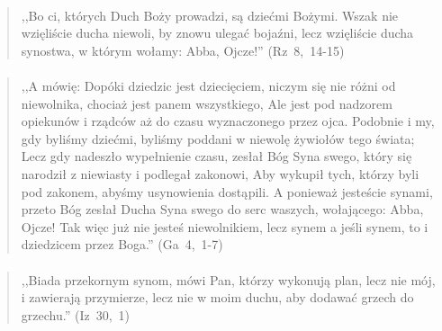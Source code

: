 \documentclass[10pt,a4paper,oneside]{article}
\begin{document}
\paragraph{}
\begin{quote}
,,Bo ci, których Duch Boży prowadzi, są dziećmi Bożymi. Wszak nie wzięliście ducha niewoli, by znowu ulegać bojaźni, lecz wzięliście ducha synostwa, w którym wołamy: Abba, Ojcze!'' \mbox{(Rz 8, 14-15)}
\end{quote}
\paragraph{}
\begin{quote}
,,A mówię: Dopóki dziedzic jest dziecięciem, niczym się nie różni od niewolnika, chociaż jest panem wszystkiego, Ale jest pod nadzorem opiekunów i rządców aż do czasu wyznaczonego przez ojca. Podobnie i my, gdy byliśmy dziećmi, byliśmy poddani w niewolę żywiołów tego świata; Lecz gdy nadeszło wypełnienie czasu, zesłał Bóg Syna swego, który się narodził z niewiasty i podlegał zakonowi, Aby wykupił tych, którzy byli pod zakonem, abyśmy usynowienia dostąpili. A ponieważ jesteście synami, przeto Bóg zesłał Ducha Syna swego do serc waszych, wołającego: Abba, Ojcze! Tak więc już nie jesteś niewolnikiem, lecz synem a jeśli synem, to i dziedzicem przez Boga.'' \mbox{(Ga 4, 1-7)}
\end{quote}
\paragraph{}
\begin{quote}
,,Biada przekornym synom, mówi Pan, którzy wykonują plan, lecz nie mój, i zawierają przymierze, lecz nie w moim duchu, aby dodawać grzech do grzechu.'' \mbox{(Iz 30, 1)}
\end{quote}
\end{document}
